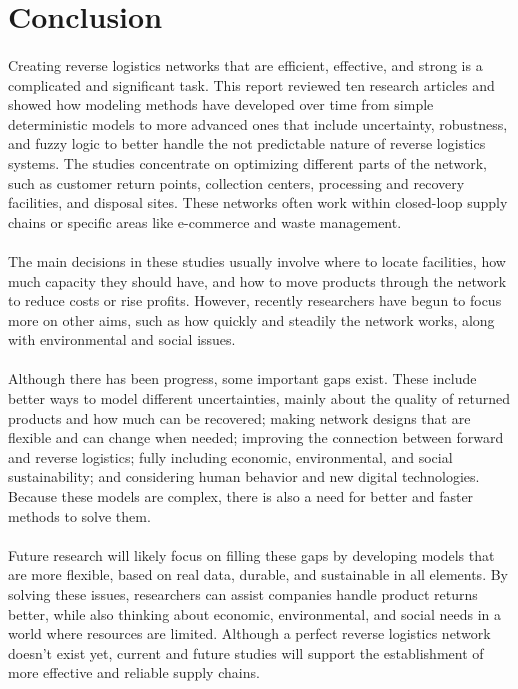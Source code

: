 \section{Conclusion}

\paragraph{} Creating reverse logistics networks that are efficient, effective, and strong is a complicated and significant task. This report reviewed ten research articles and showed how modeling methods have developed over time from simple deterministic models to more advanced ones that include uncertainty, robustness, and fuzzy logic to better handle the not predictable nature of reverse logistics systems. The studies concentrate on optimizing different parts of the network, such as customer return points, collection centers, processing and recovery facilities, and disposal sites. These networks often work within closed-loop supply chains or specific areas like e-commerce and waste management.

\paragraph{} The main decisions in these studies usually involve where to locate facilities, how much capacity they should have, and how to move products through the network to reduce costs or rise profits. However, recently researchers have begun to focus more on other aims, such as how quickly and steadily the network works, along with environmental and social issues.

\paragraph{} Although there has been progress, some important gaps exist. These include better ways to model different uncertainties, mainly about the quality of returned products and how much can be recovered; making network designs that are flexible and can change when needed; improving the connection between forward and reverse logistics; fully including economic, environmental, and social sustainability; and considering human behavior and new digital technologies. Because these models are complex, there is also a need for better and faster methods to solve them.

\paragraph{} Future research will likely focus on filling these gaps by developing models that are more flexible, based on real data, durable, and sustainable in all elements. By solving these issues, researchers can assist companies handle product returns better, while also thinking about economic, environmental, and social needs in a world where resources are limited. Although a perfect reverse logistics network doesn’t exist yet, current and future studies will support the establishment of more effective and reliable supply chains.
